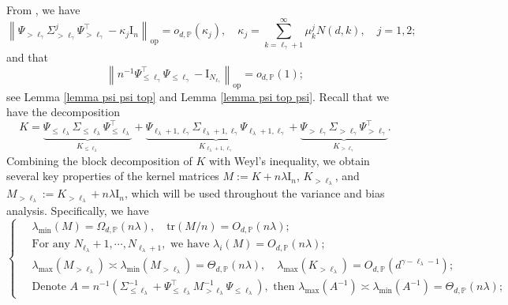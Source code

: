 \documentclass{article}
\theoremstyle{plain}
\theoremstyle{definition}
\theoremstyle{remark}
\begin{document}
\begin{appendix}
From \cite{ghorbani2021linearized}, we have
\begin{equation}\label{eqn_sketch_1}
    \left\|\Psi_{>\ell_{\gamma}} \Sigma_{>\ell_{\gamma}}^j \Psi_{>\ell_{\gamma}}^{\top} - \kappa_j\mathrm{I}_n \right\|_{\mathrm{op}} = o_{d, \mathbb{P}}(\kappa_j), \quad \kappa_j = \sum_{k=\ell_{\gamma}+1}^\infty \mu_k^j N(d, k),\quad j=1,2;
\end{equation}
and that
\begin{equation}\label{eqn_sketch_2}
\left\| n^{-1}{\Psi_{\leq \ell_{\gamma}}^{\top} \Psi_{\leq \ell_{\gamma}} } - \mathrm{I}_{N_{\ell_{\gamma}}} \right\|_{\mathrm{op}} = o_{d, \mathbb{P}}(1);
\end{equation}
see Lemma \ref{lemma psi psi top} and Lemma \ref{lemma psi top psi}. 
Recall that we have the decomposition 
$$
K = \underbrace{\Psi_{\leq \ell_{\lambda}} \Sigma_{\leq \ell_{\lambda}} \Psi_{\leq \ell_{\lambda}}^{\top}}_{K_{\leq \ell_{\lambda}}} + 
\underbrace{\Psi_{\ell_{\lambda}+ 1, \ell_{\gamma}} \Sigma_{\ell_{\lambda}+ 1, \ell_{\gamma}} \Psi_{\ell_{\lambda}+ 1, \ell_{\gamma}}}_{K_{\ell_{\lambda}+ 1, \ell_{\gamma}}}
+ \underbrace{\Psi_{>\ell_{\gamma}} \Sigma_{>\ell_{\gamma}} \Psi_{>\ell_{\gamma}}^{\top}}_{K_{>\ell_{\gamma}}}.
$$
Combining the block decomposition of $K$ with Weyl's inequality, we obtain several key properties of the kernel matrices $M := K + n\lambda \mathrm{I}_n$, $K_{>\ell_{\lambda}}$, and $M_{>\ell_{\lambda}}:=K_{>\ell_{\lambda}} + n\lambda \mathrm{I}_n$, which will be used throughout the variance and bias analysis.
Specifically, we have 
\begin{equation}\label{eqn_sketch_3}
\left\{
\begin{aligned}
    &~ \lambda_{\text{min}}\left( M\right) = \Omega_{d, \mathbb{P}}(n\lambda), \quad \mathrm{tr}(M / n)=O_{d, \mathbb{P}}(n\lambda);\\
    &~ \text{For any } N_{\ell_{\lambda}}+1, \cdots, N_{\ell_{\lambda}+1}, \text{ we have } \lambda_i(M) = O_{d, \mathbb{P}}(n\lambda);\\
    &~ \lambda_{\text{max}}(M_{>\ell_{\lambda}}) \asymp \lambda_{\text{min}}(M_{>\ell_{\lambda}}) = \Theta_{d, \mathbb{P}}(n\lambda), \quad \lambda_{\text{max}}(K_{>\ell_{\lambda}}) =
 O_{d, \mathbb{P}}\left({d^{\gamma-\ell_{\lambda}-1}}\right);\\
 &~ \text{Denote } A = n^{-1}\left(\Sigma_{\leq \ell_{\lambda}}^{-1} + \Psi_{\leq \ell_{\lambda}}^{\top} M_{>\ell_{\lambda}}^{-1} \Psi_{\leq \ell_{\lambda}}\right), \text{ then } \lambda_{\text{max}} \left(  A^{-1} \right) \asymp \lambda_{\text{min}} \left(  A^{-1} \right) = \Theta_{d, \mathbb{P}}(n\lambda);

\end{aligned}
\end{equation}
\end{appendix}
\end{document}
